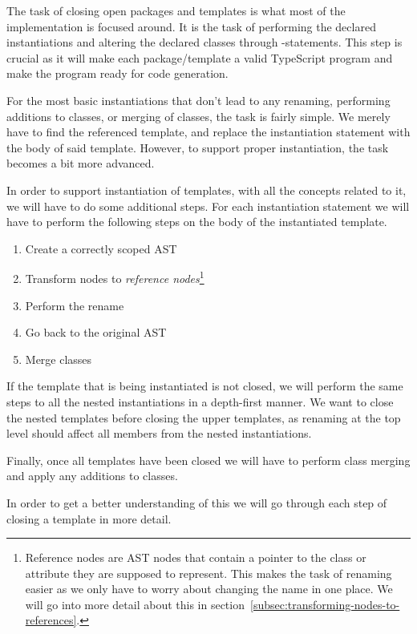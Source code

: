 The task of closing open packages and templates is what most of the implementation is focused around.
It is the task of performing the declared instantiations and altering the declared classes through -statements.
This step is crucial as it will make each package/template a valid TypeScript program and make the program ready for code generation.

For the most basic instantiations that don't lead to any renaming, performing additions to classes, or merging of classes, the task is fairly simple.
We merely have to find the referenced template, and replace the instantiation statement with the body of said template.
However, to support proper instantiation, the task becomes a bit more advanced.

In order to support instantiation of templates, with all the concepts related to it, we will have to do some additional steps.
For each instantiation statement we will have to perform the following steps on the body of the instantiated template.

\begin{enumerate}
    \item Create a correctly scoped AST
    \item Transform nodes to \textit{reference nodes}\footnote{Reference nodes are AST nodes that contain a pointer to the class or attribute they are supposed to represent. This makes the task of renaming easier as we only have to worry about changing the name in one place. We will go into more detail about this in section~\vref{subsec:transforming-nodes-to-references}.}
    \item Perform the rename
    \item Go back to the original AST
    \item Merge classes
\end{enumerate}

If the template that is being instantiated is not closed, we will perform the same steps to all the nested instantiations in a depth-first manner.
We want to close the nested templates before closing the upper templates, as renaming at the top level should affect all members from the nested instantiations.

Finally, once all templates have been closed we will have to perform class merging and apply any additions to classes.

In order to get a better understanding of this we will go through each step of closing a template in more detail.

